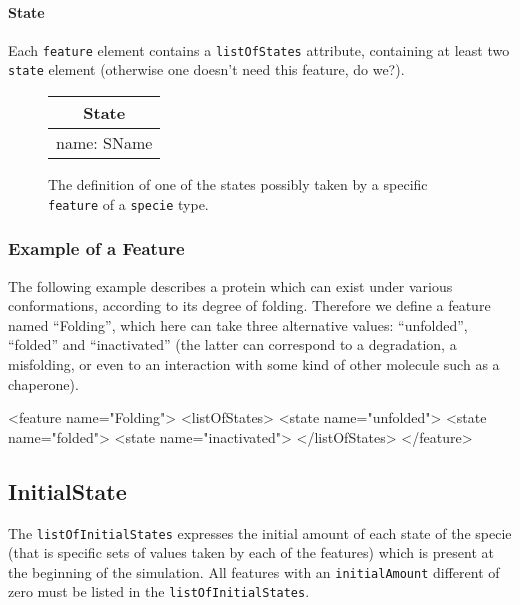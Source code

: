 \documentclass{cekarticle}
\begin{document}
\paragraph{State}\label{sec:state}

Each \texttt{feature} element contains a \texttt{listOfStates} attribute,
containing at least two \texttt{state} element (otherwise one doesn't need this
feature, do we?).

\begin{figure}[h]
  \vspace*{8pt}
  \centering
  \textcolor{red}{%
  \begin{tabular}{|l|}
    \hline
    \multicolumn{1}{|c|}{\rule[-3mm]{0mm}{8mm}{\textsf{State}}}\\
    \hline
    \rule[-3mm]{0mm}{8mm}{\textsf{\small name: SName }}\\
    \hline
  \end{tabular}
}
  \caption{The definition of one of the states possibly taken by a specific 
\texttt{feature} of a \texttt{specie} type.}
  \label{fig:state}
\end{figure}

\subsubsection{Example of a Feature}\label{sec:examplefeature}

The following example describes a protein which can exist under various
conformations, according to its degree of folding. Therefore we define a feature
named ``Folding'', which here can take three alternative values: ``unfolded'',
``folded'' and ``inactivated'' (the latter can correspond to a degradation, a
misfolding, or even to an interaction with some kind of other molecule such as a
chaperone).

\begin{example}
<feature name="Folding">
    <listOfStates>
        <state name="unfolded">
        <state name="folded">
        <state name="inactivated">
    </listOfStates>
</feature>
\end{example}


\subsection{InitialState}\label{sec:initialstate}

The \texttt{listOfInitialStates} expresses the initial amount of each state of
the specie (that is specific sets of values taken by each of the features) which
is present at the beginning of the simulation.  All features with an
\texttt{initialAmount} different of zero must be listed in the
\texttt{listOfInitialStates}.
\end{document}
